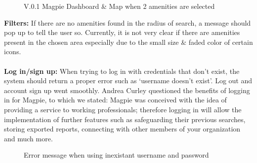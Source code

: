 \begin{figure}[h!]
    \centering
    \caption{V.0.1 Magpie Dashboard \& Map when 2 amenities are selected}
\end{figure}

\newpage
\noindent\textbf{Filters: }
If there are no amenities found in the radius of search, a message should pop up to tell the user so. Currently, it is not very clear if there are amenities present in the chosen area especially due to the small size \& faded color of certain icons. \\ \\
\textbf{Log in/sign up: }
When trying to log in with credentials that don't exist, the system should return a proper error such as `username doesn't exist'. Log out and account sign up went smoothly. Andrea Curley questioned the benefits of logging in for Magpie, to which we stated:
Magpie was conceived with the idea of providing a service to working professionals; therefore logging in will allow the implementation of further features such as safeguarding their previous searches, storing exported reports, connecting with other members of your organization and much more.
\begin{figure}[h!]
    \centering
    \caption{Error message when using inexistant username and password}
\end{figure}

